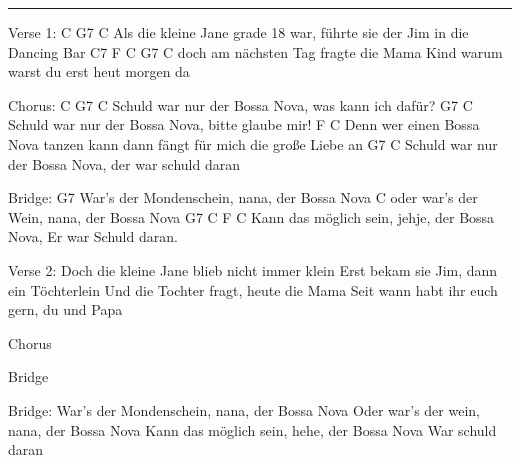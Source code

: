 \noindent\rule{\columnwidth}{1pt}

\begin{lstsong}
Verse 1:
C                             G7                                     C
Als die kleine Jane grade 18 war, führte sie der Jim in die Dancing Bar
                 C7               F        C             G7               C
doch am nächsten Tag fragte die Mama Kind warum warst du erst heut morgen da

Chorus:
   C                     G7                   C
Schuld war nur der Bossa Nova, was kann ich dafür?
                         G7                 C
Schuld war nur der Bossa Nova, bitte glaube mir!
                     F                                        C
Denn wer einen Bossa Nova tanzen kann dann fängt für mich die große Liebe an
												 G7                     C
Schuld war nur der Bossa Nova, der war schuld daran

Bridge:
                G7
War's der Mondenschein, nana, der Bossa Nova
               C
oder war's der Wein, nana, der Bossa Nova
                 G7                           C      F        C
Kann das möglich sein, jehje, der Bossa Nova, Er war Schuld daran.

Verse 2:
Doch die kleine Jane blieb nicht immer klein
Erst bekam sie Jim, dann ein Töchterlein
Und die Tochter fragt, heute die Mama
Seit wann habt ihr euch gern, du und Papa

Chorus

Bridge

Bridge:
War's der Mondenschein, nana, der Bossa Nova
Oder war's der wein, nana, der Bossa Nova
Kann das möglich sein, hehe, der Bossa Nova
War schuld daran
\end{lstsong}
\newpage
